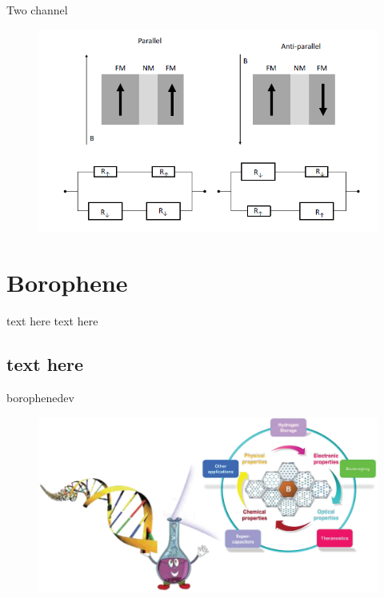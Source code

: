 \documentclass[handout,t]{beamer}
\begin{document}
\begin{frame}{Two channel}
	\begin{figure}[!ht]
		\centering
		\includegraphics[width=\linewidth]{../figures/twochannelmodel.png}
		\label{fig:twochannelmodel}
	\end{figure}
\end{frame}
\section{Borophene}
\begin{frame}{text here}
	text here
\end{frame}
\subsection{text here}
\begin{frame}{borophenedev}
	\begin{figure}[!h]
		\centering
		\includegraphics[width=\linewidth]{../figures/borophenedev.png}
		\label{fig:borophenedev}
	\end{figure}
\end{frame}
\end{document}
